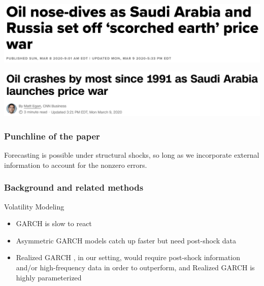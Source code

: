 \documentclass{beamer}
\theoremstyle{definition}
\begin{document}
\begin{frame}

    \begin{example}
    \href{https://www.cnbc.com/2020/03/08/opec-deal-collapse-sparks-price-war-20-oil-in-2020-is-coming.html}{\includegraphics[scale=.3]{cnn.png}}
    \end{example}

    \begin{example}
    \href{https://www.cnn.com/2020/03/08/investing/oil-prices-crash-opec-russia-saudi-arabia/index.html}{\includegraphics[scale=.3]{cnbc.png}}
    \end{example}

\end{frame}

\begin{frame}
\frametitle{Punchline of the paper}

Forecasting is possible under structural shocks, so long as we incorporate external information to account for the nonzero errors.

\end{frame}

\begin{frame}
    \frametitle{Background and related methods}
    Volatility Modeling

    \begin{itemize}
        \item GARCH is slow to react \parencite[][]{andersen2003modeling}
        \item Asymmetric GARCH models catch up faster but need post-shock data
        \item Realized GARCH \parencite[][]{hansen2012realized}, in our setting, would require post-shock information and/or high-frequency data in order to outperform, and Realized GARCH is highly parameterized
    \end{itemize}
\end{frame}
\end{document}
